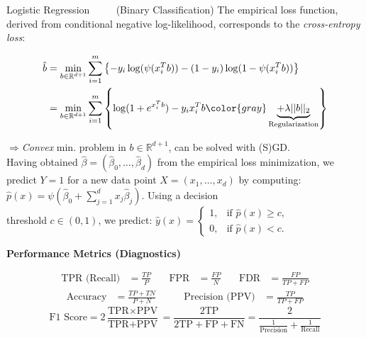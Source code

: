 \documentclass[a4paper,10pt]{article}
\def\R{\mathbb{R}}
\newcommand{\subtitle}[1]{\begin{normalsize}\vspace{0.25cm}\textbf{#1} \end{normalsize}}
\begin{document}
\begin{small}
\begin{subbox}{Logistic Regression $\quad \quad$ (Binary Classification)}
    The empirical loss function, derived from conditional negative log-likelihood, corresponds to the \textit{cross-entropy loss}:
    
    \begin{align*}
    \hat{b} & = \min_{b \in \mathbb{R}^{d+1}} \sum_{i=1}^{m} \left\{ -y_i \log(\psi(x_i^T b)) - (1 - y_i) \log(1 - \psi(x_i^T b)) \right\} \\ 
    & = \min_{b \in \mathbb{R}^{d+1}} \sum_{i=1}^{m} \left\{ \log(1 + e^{x_i^T b}) - y_i x_i^T b  \begingroup \color{gray} \underbrace{ + \lambda ||b||_2}_{\text{Regularization}}  \endgroup \right \}
    \end{align*}

\end{subbox}

$\Rightarrow$\textit{Convex} min. problem in $b \in \R^{d+1}$, can be solved with (S)GD. \\

Having obtained $\hat{\beta} = (\hat{\beta}_0, \dots, \hat{\beta}_d)$ from the empirical loss minimization, we predict $Y = 1$ for a new data point $X = (x_1, \dots, x_d)$ by computing:
$
\hat{p}(x) = \psi\left( \hat{\beta}_0 + \sum_{j=1}^{d} x_j \hat{\beta}_j \right).
$
Using a decision \\ threshold $c \in (0, 1)$, we predict:
$
\hat{y}(x) = \begin{cases}
1, & \text{if } \hat{p}(x) \geq c, \\
0, & \text{if } \hat{p}(x) < c.
\end{cases}
$



\subtitle{Performance Metrics (Diagnostics)}  
\vspace{-0.2cm} %
\begin{align*}
\text{TPR (Recall)}&=\frac{TP}{P} \quad &  \text{FPR}&=\frac{FP}{N} \quad & \text{FDR}&=\frac{FP}{TP+FP}
\end{align*}
\begin{align*}
\text{Accuracy}&=\frac{TP + TN}{P+N} \quad \quad    &  \text{Precision (PPV)}&=\frac{TP}{TP+FP}            
\end{align*}
$$
\text{F1 Score} = 2 \frac{\text{TPR} \times \text{PPV}}{\text{TPR} + \text{PPV}} = \frac{2 \text{TP}}{2 \text{TP} + \text{FP} + \text{FN}} = \frac{2}{\frac{1}{\text{Precision}} + \frac{1}{\text{Recall}}}
$$


\end{small}
\end{document}
